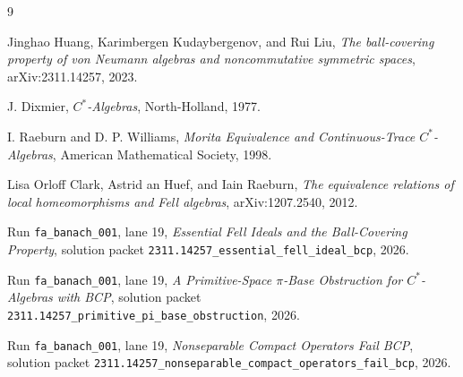 \documentclass[11pt]{article}
\begin{document}
\begin{thebibliography}{9}

Jinghao Huang, Karimbergen Kudaybergenov, and Rui Liu,
\emph{The ball-covering property of von Neumann algebras and noncommutative
symmetric spaces},
arXiv:2311.14257, 2023.

J. Dixmier,
\emph{\(C^*\)-Algebras},
North-Holland, 1977.

I. Raeburn and D. P. Williams,
\emph{Morita Equivalence and Continuous-Trace \(C^*\)-Algebras},
American Mathematical Society, 1998.

Lisa Orloff Clark, Astrid an Huef, and Iain Raeburn,
\emph{The equivalence relations of local homeomorphisms and Fell algebras},
arXiv:1207.2540, 2012.

Run \texttt{fa\_banach\_001}, lane 19,
\emph{Essential Fell Ideals and the Ball-Covering Property},
solution packet
\texttt{2311.14257\_essential\_fell\_ideal\_bcp}, 2026.

Run \texttt{fa\_banach\_001}, lane 19,
\emph{A Primitive-Space \(\pi\)-Base Obstruction for \(C^*\)-Algebras with
BCP},
solution packet
\texttt{2311.14257\_primitive\_pi\_base\_obstruction}, 2026.

Run \texttt{fa\_banach\_001}, lane 19,
\emph{Nonseparable Compact Operators Fail BCP},
solution packet
\texttt{2311.14257\_nonseparable\_compact\_operators\_fail\_bcp}, 2026.

\end{thebibliography}
\end{document}

